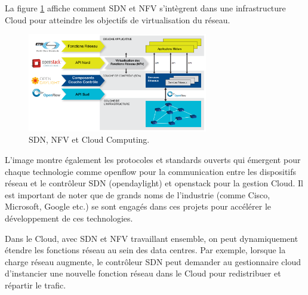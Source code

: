 La figure \ref{cloud-sdn-nfv} affiche comment SDN et NFV s'intègrent dans une infrastructure Cloud pour atteindre les objectifs de virtualisation du réseau. \\

\begin{figure}[h]
\begin{center}
\includegraphics[width=0.7\textwidth]{images/cloud-sdn-nfv_T} 
\caption{SDN, NFV et Cloud Computing. \cite{OFSDNNFVand}} \label{cloud-sdn-nfv}
\end{center}
\end{figure} 

L'image montre également les protocoles et standards ouverts qui émergent pour chaque technologie comme \gls{openflow} pour la communication entre les dispositifs réseau et le contrôleur SDN (\gls{opendaylight}) et \gls{openstack} pour la gestion Cloud. Il est important de noter que de grands noms de l’industrie (comme Cisco, Microsoft, Google etc.) se sont engagés dans ces projets pour accélérer le développement de ces technologies.

Dans le Cloud, avec SDN et NFV travaillant ensemble, on peut dynamiquement étendre les fonctions réseau au sein des data centres. Par exemple, lorsque la charge réseau augmente, le contrôleur SDN peut demander au gestionnaire cloud d'instancier une nouvelle fonction réseau dans le Cloud pour redistribuer et répartir le trafic. 

